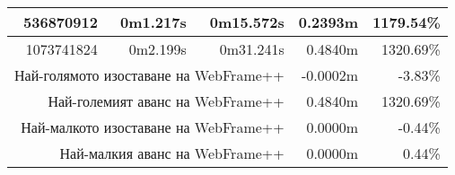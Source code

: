 \documentclass[documentation.tex]{subfiles}
\begin{document}
\begin{longtable}{|r|r|r|r|r|}
        536870912                                                                                                                 & 0m1.217s                        & 0m15.572s                                                                   & {\color[HTML]{32CB00} 0.2393m}                    & {\color[HTML]{32CB00} 1179.54\%}                  \\ \hline
        1073741824                                                                                                                & 0m2.199s                        & 0m31.241s                                                                   & {\color[HTML]{32CB00} 0.4840m}                    & {\color[HTML]{32CB00} 1320.69\%}                  \\ \hline
        \multicolumn{3}{|r|}{Най-голямото изоставане на WebFrame++}                                                                                                                                                                               & {\color[HTML]{FF0000} -0.0002m}                   & {\color[HTML]{FF0000} -3.83\%}                    \\ \hline
        \multicolumn{3}{|r|}{Най-големият аванс на WebFrame++}                                                                                                                                                                                      & {\color[HTML]{32CB00} 0.4840m}                    & {\color[HTML]{32CB00} 1320.69\%}                  \\ \hline
        \multicolumn{3}{|r|}{Най-малкото изоставане на WebFrame++}                                                                                                                                                                                & {\color[HTML]{FF0000} 0.0000m}                    & {\color[HTML]{FF0000} -0.44\%}                    \\ \hline
        \multicolumn{3}{|r|}{Най-малкия аванс на WebFrame++}                                                                                                                                                                                      & {\color[HTML]{32CB00} 0.0000m}                    & {\color[HTML]{32CB00} 0.44\%}                     \\ \hline
        \end{longtable} \\
    
\end{document}
